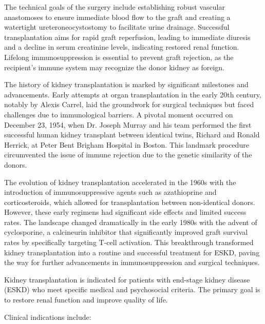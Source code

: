 The technical goals of the surgery include establishing robust vascular anastomoses to ensure immediate blood flow to the graft and creating a watertight ureteroneocystostomy to facilitate urine drainage. Successful transplantation aims for rapid graft reperfusion, leading to immediate diuresis and a decline in serum creatinine levels, indicating restored renal function. Lifelong immunosuppression is essential to prevent graft rejection, as the recipient's immune system may recognize the donor kidney as foreign.

The history of kidney transplantation is marked by significant milestones and advancements. Early attempts at organ transplantation in the early 20th century, notably by Alexis Carrel, laid the groundwork for surgical techniques but faced challenges due to immunological barriers. A pivotal moment occurred on December 23, 1954, when Dr. Joseph Murray and his team performed the first successful human kidney transplant between identical twins, Richard and Ronald Herrick, at Peter Bent Brigham Hospital in Boston. This landmark procedure circumvented the issue of immune rejection due to the genetic similarity of the donors.

The evolution of kidney transplantation accelerated in the 1960s with the introduction of immunosuppressive agents such as azathioprine and corticosteroids, which allowed for transplantation between non-identical donors. However, these early regimens had significant side effects and limited success rates. The landscape changed dramatically in the early 1980s with the advent of cyclosporine, a calcineurin inhibitor that significantly improved graft survival rates by specifically targeting T-cell activation. This breakthrough transformed kidney transplantation into a routine and successful treatment for ESKD, paving the way for further advancements in immunosuppression and surgical techniques.

Kidney transplantation is indicated for patients with end-stage kidney disease (ESKD) who meet specific medical and psychosocial criteria. The primary goal is to restore renal function and improve quality of life. 

Clinical indications include:

